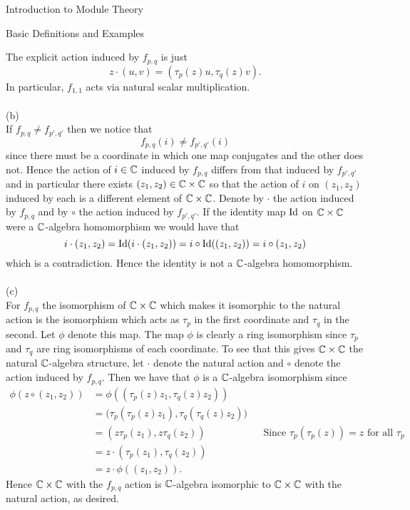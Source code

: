 \begin{chapter}{Introduction to Module Theory}
\begin{section}{Basic Definitions and Examples}
\begin{solution}
The explicit action induced by $f_{p,q}$ is just\[
z\cdot(u,v) = (\tau_p(z)u, \tau_q(z)v).
\]
In particular, $f_{1,1}$ acts via natural scalar multiplication. \\\\
(b)\\
If $f_{p,q} \neq f_{p',q'}$ then we notice that \[
f_{p,q}(i) \neq f_{p',q'}(i)
\]
since there must be a coordinate in which one map conjugates and the other does not. Hence the action of $i\in \mathbb{C}$ induced by $f_{p,q}$ differs from that induced by $f_{p',q'}$ and in particular there exists $(z_1,z_2)\in \mathbb{C}\times\mathbb{C}$ so that the action of $i$ on $(z_1,z_2)$ induced by each is a different element of $\mathbb{C}\times \mathbb{C}$. Denote by $\cdot$ the action induced by $f_{p,q}$ and by $\circ$ the action induced by $f_{p',q'}$. If the identity map $\operatorname{Id}$ on $\mathbb{C} \times \mathbb{C}$ were a $\mathbb{C}$-algebra homomorphism we would have that \[i\cdot(z_1,z_2) = \operatorname{Id}(i\cdot (z_1,z_2)) = i\circ \operatorname{Id}((z_1,z_2)) = i\circ (z_1,z_2)\] which is a contradiction. Hence the identity is not a $\mathbb{C}$-algebra homomorphism.\\\\
(c)\\
For $f_{p,q}$ the isomorphism of $\mathbb{C}\times\mathbb{C}$ which makes it isomorphic to the natural action is the isomorphism which acts as $\tau_p$ in the first coordinate and $\tau_q$ in the second. Let $\phi$ denote this map. The map $\phi$ is clearly a ring isomorphism since $\tau_p$ and $\tau_q$ are ring isomorphisms of each coordinate. To see that this gives $\mathbb{C}\times\mathbb{C}$ the natural $\mathbb{C}$-algebra structure, let $\cdot$ denote the natural action and $\circ$ denote the action induced by $f_{p,q}$. Then we have that $\phi$ is a $\mathbb{C}$-algebra isomorphism since \begin{align*}
\phi(z\circ (z_1,z_2))& = \phi((\tau_p(z)z_1,\tau_q(z)z_2))\\
& = \big(\tau_p(\tau_p(z)z_1),\tau_q(\tau_q(z)z_2)\big)\\
& = (z\tau_p(z_1),z\tau_q(z_2)) &&\text{Since $\tau_p(\tau_p(z)) = z$ for all $\tau_p$}\\
& = z\cdot(\tau_p(z_1),\tau_q(z_2))\\
&=z\cdot \phi((z_1,z_2)).
\end{align*}
Hence $\mathbb{C}\times\mathbb{C}$ with the $f_{p,q}$ action is $\mathbb{C}$-algebra isomorphic to $\mathbb{C}\times\mathbb{C}$ with the natural action, as desired.

\end{solution}\oneperpage


\end{section}










\end{chapter}
